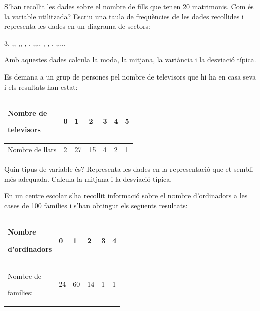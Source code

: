 \begin{mylist}
	
 \exer[1] S'han recollit les dades sobre el nombre de fills que tenen 20 matrimonis. Com és la variable utilitzada? Escriu una taula de freqüències de les dades recollides i representa les dades en un diagrama de sectors:  
\begin{center}
3, ,, ,, , , ,,,, , , , ,,,,,
\end{center}
 Amb aquestes dades calcula la moda, la mitjana, la variància i la desviació típica. 
  

\vso

 \exer[1] Es demana a un grup de persones pel nombre de televisors que hi ha en casa seva i els resultats han estat: 

\begin{longtable}{|p{1.2in}|p{0.2in}|p{0.2in}|p{0.2in}|p{0.2in}|p{0.2in}|p{0.2in}|} \hline 
Nombre de \par televisors & 0 & 1 & 2 & 3 & 4 & 5 \\ \hline 
Nombre de llars & 2 & 27 & 15 & 4 & 2 & 1 \\ \hline 
\end{longtable}

Quin tipus de variable és? Representa les dades en la representació que et sembli més adequada. Calcula la mitjana i la desviació típica.


\vso

\exer[1] En un centre escolar s'ha recollit informació sobre el nombre d'ordinadors a les cases de 100 famílies i s'han obtingut els següents resultats: 

\begin{longtable}{|p{1.3in}|p{0.3in}|p{0.3in}|p{0.3in}|p{0.3in}|p{0.3in}|} \hline 
Nombre \par d'ordinadors & 0 & 1 & 2 & 3 & 4 \\ \hline 
Nombre de \par famílies: & 24 & 60 & 14 & 1 & 1 \\ \hline 
\end{longtable}


\end{mylist}
